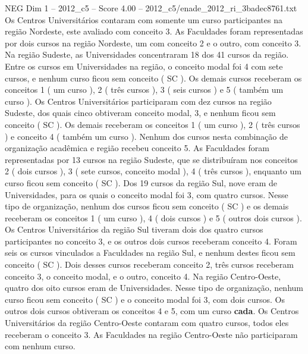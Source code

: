 \begin{textsample}{NEG Dim 1 – 2012\_c5 – Score 4.00 – 2012\_c5/enade\_2012\_ri\_3badec8761.txt}
Os Centros Universitários contaram com somente um curso participantes na região Nordeste, este avaliado com conceito 3.
As Faculdades foram representadas por dois cursos na região Nordeste, um com conceito 2 e o outro, com conceito 3.
Na região Sudeste, as Universidades concentraram 18 dos 41 cursos da região.
Entre os cursos em Universidades na região, o conceito modal foi 4 com sete cursos, e nenhum curso ficou sem conceito ( SC ).
Os demais cursos receberam os conceitos 1 ( um curso ), 2 ( três cursos ), 3 ( seis cursos ) e 5 ( também um curso ).
Os Centros Universitários participaram com dez cursos na região Sudeste, dos quais cinco obtiveram conceito modal, 3, e nenhum ficou sem conceito ( SC ).
Os demais receberam os conceitos 1 ( um curso ), 2 ( três cursos ) e conceito 4 ( também um curso ).
Nenhum dos cursos nesta combinação de organização acadêmica e região recebeu conceito 5.
As Faculdades foram representadas por 13 cursos na região Sudeste, que se distribuíram nos conceitos 2 ( dois cursos ), 3 ( sete cursos, conceito modal ), 4 ( três cursos ), enquanto um curso ficou sem conceito ( SC ).
Dos 19 cursos da região Sul, nove eram de Universidades, para os quais o conceito modal foi 3, com quatro cursos.
Nesse tipo de organização, nenhum dos cursos ficou sem conceito ( SC ) e os demais receberam os conceitos 1 ( um curso ), 4 ( dois cursos ) e 5 ( outros dois cursos ).
Os Centros Universitários da região Sul tiveram dois dos quatro cursos participantes no conceito 3, e os outros dois cursos receberam conceito 4.
Foram seis os cursos vinculados a Faculdades na região Sul, e nenhum destes ficou sem conceito ( SC ).
Dois desses cursos receberam conceito 2, três cursos receberam conceito 3, o conceito modal, e o outro, conceito 4.
Na região Centro-Oeste, quatro dos oito cursos eram de Universidades.
Nesse tipo de organização, nenhum curso ficou sem conceito ( SC ) e o conceito modal foi 3, com dois cursos.
Os outros dois cursos obtiveram os conceitos 4 e 5, com um curso \textbf{cada}.
Os Centros Universitários da região Centro-Oeste contaram com quatro cursos, todos eles receberam o conceito 3.
As Faculdades na região Centro-Oeste não participaram com nenhum curso.

\end{textsample}
